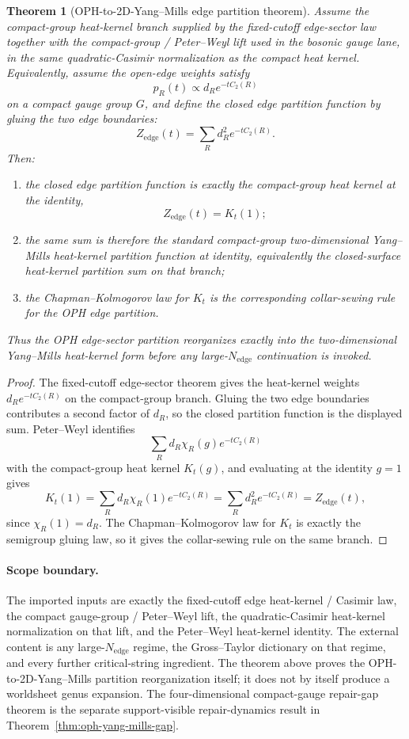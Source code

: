 \documentclass[11pt]{article}
\newtheorem{theorem}{Theorem}[section]
\begin{document}
\begin{theorem}[OPH-to-2D-Yang--Mills edge partition theorem]\label{thm:edge-2dym}
Assume the compact-group heat-kernel branch supplied by the fixed-cutoff edge-sector law together
with the compact-group / Peter--Weyl lift used in the bosonic gauge lane, in the same
quadratic-Casimir normalization as the compact heat kernel. Equivalently, assume the open-edge
weights satisfy
\[
p_R(t)\propto d_R e^{-tC_2(R)}
\]
on a compact gauge group \(G\), and define the closed edge partition function by gluing the two
edge boundaries:
\[
Z_{\mathrm{edge}}(t)=\sum_R d_R^2 e^{-tC_2(R)}.
\]
Then:
\begin{enumerate}[label=\textup{(\roman*)},leftmargin=2em]
\item the closed edge partition function is exactly the compact-group heat kernel at the identity,
\[
Z_{\mathrm{edge}}(t)=K_t(1);
\]
\item the same sum is therefore the standard compact-group two-dimensional Yang--Mills
heat-kernel partition function at identity, equivalently the closed-surface heat-kernel partition
sum on that branch;
\item the Chapman--Kolmogorov law for \(K_t\) is the corresponding collar-sewing rule for the OPH
edge partition.
\end{enumerate}
Thus the OPH edge-sector partition reorganizes exactly into the two-dimensional Yang--Mills
heat-kernel form before any large-\(N_{\mathrm{edge}}\) continuation is invoked.
\end{theorem}

\begin{proof}
The fixed-cutoff edge-sector theorem gives the heat-kernel weights \(d_R e^{-tC_2(R)}\) on the
compact-group branch. Gluing the two edge boundaries contributes a second factor of \(d_R\), so the
closed partition function is the displayed sum. Peter--Weyl identifies
\[
\sum_R d_R \chi_R(g)e^{-tC_2(R)}
\]
with the compact-group heat kernel \(K_t(g)\), and evaluating at the identity \(g=1\) gives
\[
K_t(1)=\sum_R d_R \chi_R(1)e^{-tC_2(R)}=\sum_R d_R^2 e^{-tC_2(R)}=Z_{\mathrm{edge}}(t),
\]
since \(\chi_R(1)=d_R\). The Chapman--Kolmogorov law for \(K_t\) is exactly the semigroup gluing
law, so it gives the collar-sewing rule on the same branch.
\end{proof}

\paragraph{Scope boundary.}
The imported inputs are exactly the fixed-cutoff edge heat-kernel / Casimir law, the compact
gauge-group / Peter--Weyl lift, the quadratic-Casimir heat-kernel normalization on that lift, and
the Peter--Weyl heat-kernel identity. The external content is any large-\(N_{\mathrm{edge}}\)
regime, the Gross--Taylor dictionary on that regime, and every further critical-string
ingredient. The theorem above proves the OPH-to-2D-Yang--Mills partition reorganization itself; it
does not by itself produce a worldsheet genus expansion. The four-dimensional compact-gauge
repair-gap theorem is the separate support-visible repair-dynamics result in
Theorem~\ref{thm:oph-yang-mills-gap}.
\end{document}
